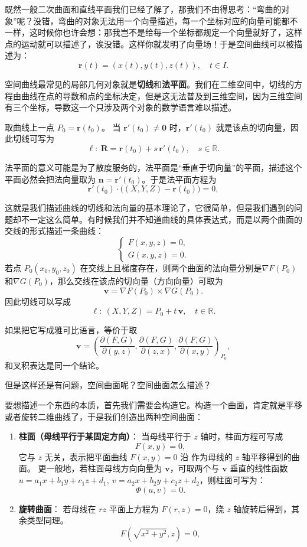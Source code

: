 \documentclass[UTF8]{ctexbook}
\begin{document}
既然一般二次曲面和直线平面我们已经了解了，那我们不由得思考：“弯曲的对象”呢？没错，弯曲的对象无法用一个向量描述，每一个坐标对应的向量可能都不一样，这时候你也许会想：那我岂不是给每一个坐标都规定一个向量就好了，这样点的运动就可以描述了，诶没错。这样你就发明了向量场！于是空间曲线可以被描述为：
\[
\mathbf{r}(t)=(x(t),y(t),z(t)),\quad t\in I.
\]


空间曲线最常见的局部几何对象就是\textbf{切线}和\textbf{法平面}。我们在二维空间中，切线的方程由曲线在点的导数和点的坐标决定，但是这无法普及到三维空间，因为三维空间有三个坐标，导数这一个只涉及两个对象的数学语言难以描述。

取曲线上一点 $P_0=\mathbf{r}(t_0)$。
当 $\mathbf{r}'(t_0)\neq\mathbf{0}$ 时，$\mathbf{r}'(t_0)$ 就是该点的切向量，因此切线可写为
\[
\ell:\ \mathbf{R}=\mathbf{r}(t_0)+s\,\mathbf{r}'(t_0),\quad s\in\mathbb{R}.
\]

法平面的意义可能是为了散度服务的，法平面是“垂直于切向量”的平面，描述这个平面必然会把法向量取为 $\mathbf{n}=\mathbf{r}'(t_0)$。于是法平面方程为
\[
\mathbf{r}'(t_0)\cdot\bigl((X,Y,Z)-\mathbf{r}(t_0)\bigr)=0,
\]

这就是我们描述曲线的切线和法向量的基本理论了，它很简单，但是我们遇到的问题却不一定这么简单。有时候我们并不知道曲线的具体表达式，而是以两个曲面的交线的形式描述一条曲线：
\[
\begin{cases}
F(x,y,z)=0,\\
G(x,y,z)=0.
\end{cases}
\]
若点 $P_0(x_0,y_0,z_0)$ 在交线上且梯度存在，则两个曲面的法向量分别是$\nabla F(P_0)$ 和$ \nabla G(P_0)$，那么交线在该点的切向量（方向向量）可取为
\[
\mathbf{v}=\nabla F(P_0)\times \nabla G(P_0).
\]
因此切线可以写成
\[
\ell:\ (X,Y,Z)=P_0+t\,\mathbf{v},\quad t\in\mathbb{R}.
\]

如果把它写成雅可比语言，等价于取
\[
\mathbf{v}=
\left(
\frac{\partial(F,G)}{\partial(y,z)},
\frac{\partial(F,G)}{\partial(z,x)},
\frac{\partial(F,G)}{\partial(x,y)}
\right)_{P_0},
\]
和叉积表达是同一个结论。

但是这样还是有问题，空间曲面呢？空间曲面怎么描述？

要想描述一个东西的本质，首先我们需要会构造它。构造一个曲面，肯定就是平移或者旋转二维曲线了，于是我们创造出两种空间曲面：
\begin{enumerate}
  \item \textbf{柱面（母线平行于某固定方向）}：
  当母线平行于 $z$ 轴时，柱面方程可写成
  \[
  F(x,y)=0,
  \]
  它与 $z$ 无关，表示把平面曲线 $F(x,y)=0$ 沿 作为母线的 $z$ 轴平移得到的曲面。
  更一般地，若柱面母线方向向量为 $\mathbf{v}$，可取两个与 $\mathbf{v}$ 垂直的线性函数
  $u=a_1x+b_1y+c_1z+d_1,\ v=a_2x+b_2y+c_2z+d_2$，则柱面可写为：
  \[
  \Phi(u,v)=0.
  \]

  \item \textbf{旋转曲面}：
  若母线在 $rz$ 平面上方程为 $F(r,z)=0$，绕 $z$ 轴旋转后得到，其余类型同理。
  \[
  F\!\left(\sqrt{x^2+y^2},z\right)=0,
  \]
\end{enumerate}
\end{document}
